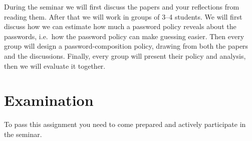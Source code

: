 During the seminar we will first discuss the papers and your reflections from 
reading them.
After that we will work in groups of 3--4 students.
We will first discuss how we can estimate how much a password policy reveals 
about the passwords, i.e.\ how the password policy can make guessing easier.
Then every group will design a password-composition policy, drawing from both 
the papers and the discussions.
Finally, every group will present their policy and analysis, then we will 
evaluate it together.


\section{Examination}%
\label{sec:exam}

To pass this assignment you need to come prepared and actively participate in 
the seminar.


\subsubsection*{\ackname}




\printbibliography{}

